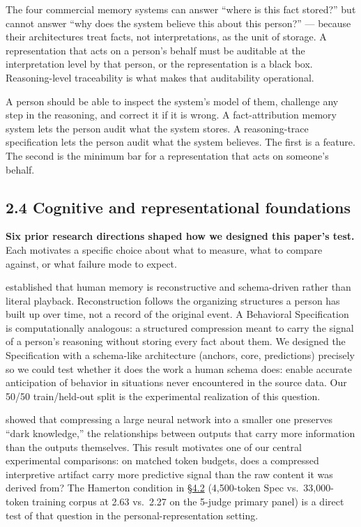 The four commercial memory systems can answer ``where is this fact
stored?'' but cannot answer ``why does the system believe this about
this person?'' --- because their architectures treat facts, not
interpretations, as the unit of storage. A representation that acts on a
person's behalf must be auditable at the interpretation level by that
person, or the representation is a black box. Reasoning-level
traceability is what makes that auditability operational.

A person should be able to inspect the system's model of them, challenge
any step in the reasoning, and correct it if it is wrong. A
fact-attribution memory system lets the person audit what the system
stores. A reasoning-trace specification lets the person audit what the
system believes. The first is a feature. The second is the minimum bar
for a representation that acts on someone's behalf.

\hypertarget{cognitive-and-representational-foundations}{%
\subsection{2.4 Cognitive and representational
foundations}\label{cognitive-and-representational-foundations}}

\textbf{Six prior research directions shaped how we designed this
paper's test.} Each motivates a specific choice about what to measure,
what to compare against, or what failure mode to expect.

\textbf{\citet{bartlett1932}} established that human memory is reconstructive
and schema-driven rather than literal playback. Reconstruction follows
the organizing structures a person has built up over time, not a record
of the original event. A Behavioral Specification is computationally
analogous: a structured compression meant to carry the signal of a
person's reasoning without storing every fact about them. We designed
the Specification with a schema-like architecture (anchors, core,
predictions) precisely so we could test whether it does the work a human
schema does: enable accurate anticipation of behavior in situations
never encountered in the source data. Our 50/50 train/held-out split is
the experimental realization of this question.

\textbf{\citet{hinton2015distilling}} showed that compressing a large neural
network into a smaller one preserves ``dark knowledge,'' the
relationships between outputs that carry more information than the
outputs themselves. This result motivates one of our central
experimental comparisons: on matched token budgets, does a compressed
interpretive artifact carry more predictive signal than the raw content
it was derived from? The Hamerton condition in \hyperref[compression-structure-vs.-raw-text]{§4.2} (4,500-token Spec
vs.~33,000-token training corpus at 2.63 vs.~2.27 on the 5-judge primary
panel) is a direct test of that question in the personal-representation
setting.

